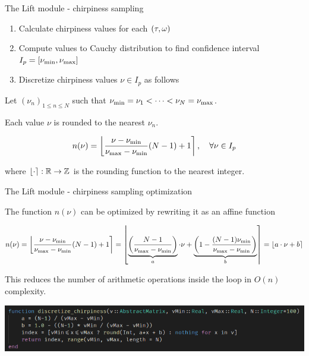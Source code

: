 \documentclass[10pt,american,ignorenonframetext,aspectratio=1610]{beamer}
\providecommand{\tightlist}{%
  \setlength{\itemsep}{0pt}\setlength{\parskip}{0pt}}
\theoremstyle{remark}
\begin{document}
\begin{frame}{The Lift module - chirpiness sampling}
\protect\hypertarget{the-lift-module---chirpiness-sampling}{}

\begin{enumerate}
\tightlist
\item
  Calculate chirpiness values for each \((\tau,\omega)\)
\item
  Compute values to Cauchy distribution to find confidence interval
  \(I_p=[\nu_{\min},\nu_{\max}]\)
\item
  Discretize chirpiness values \(\nu\in I_p\) as follows
\end{enumerate}

Let \((\nu_n)_{1\leq n\leq N}\) such that
\(\nu_{\min}=\nu_1<\cdots<\nu_N=\nu_{\max}\).

Each value \(\nu\) is rounded to the nearest \(\nu_n\).

\[n(\nu) = \left\lfloor\frac{\nu - \nu_{\min}}{\nu_{\max} - \nu_{\min}}(N-1) + 1\right\rceil,\quad\forall\nu\in I_p\]

where \(\left\lfloor\cdot\right\rceil:\mathbb{R}\rightarrow\mathbb{Z}\) is the rounding function to the
nearest integer.

\end{frame}

\begin{frame}{The Lift module - chirpiness sampling optimization}
\protect\hypertarget{the-lift-module---chirpiness-sampling-optimization}{}

The function \(n(\nu)\) can be optimized by rewriting it as an affine
function

\[n(\nu) = \left\lfloor\frac{\nu - \nu_{\min}}{\nu_{\max} - \nu_{\min}}(N-1) + 1\right\rceil
  = \left\lfloor\underbrace{\left(\frac{N-1}{\nu_{\max} - \nu_{\min}}\right)}_a \cdot\nu
    + \underbrace{\left(1 - \frac{(N-1)\nu_{\min}}{\nu_{\max} - \nu_{\min}}\right)}_b\right\rceil
  = \left\lfloor a\cdot\nu + b\right\rceil\]

This reduces the number of arithmetic operations inside the loop in
\(O(n)\) complexity.

\includegraphics{img/chirpiness_function.png}

\end{frame}
\end{document}
